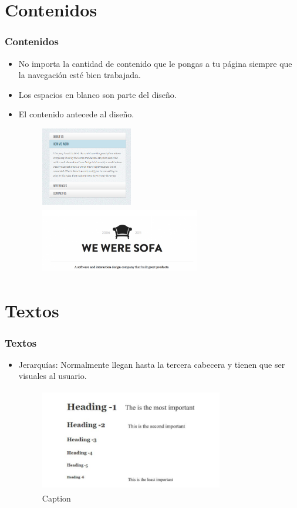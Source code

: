 \documentclass[11pt]{beamer}
\begin{document}
    \section{Contenidos}
    \begin{frame}
    \frametitle{Contenidos}
    \begin{itemize}
    \item No importa la cantidad de contenido que le pongas a tu página siempre que la navegación esté bien trabajada.
    \item Los espacios en blanco son parte del diseño.
    \item El contenido antecede al diseño.
    \begin{figure}
        \centering
        \includegraphics[width=4cm, heigth=5cm]{acordeon.png}
        \includegraphics[width=7cm, height=3cm]{blanco.png}
    \end{figure}
    \end{itemize}
    \end{frame}
    
    
    \section{Textos}
    \begin{frame}
    \frametitle{Textos}
    \begin{itemize}
        \item Jerarquías: Normalmente llegan hasta la tercera cabecera y tienen que ser visuales al usuario. 
        \begin{figure}
            \centering
            \includegraphics[width=8cm, height=4.5cm]{heading-tags.jpg}
            \caption{Caption}
            \label{fig:my_label}
        \end{figure}
    \end{itemize}
        
    \end{frame}
    
\end{document}
